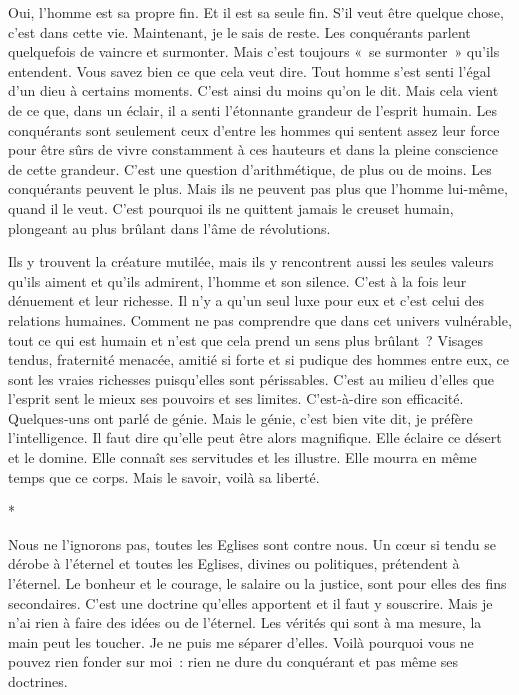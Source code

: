 \documentclass{book}
\begin{document}
Oui, l'homme est sa propre fin. Et il est sa seule fin. S'il veut être quelque chose, c'est dans cette vie. Maintenant, je le sais de reste. Les conquérants parlent quelquefois de vaincre et surmonter. Mais c'est toujours « se surmonter » qu'ils entendent. Vous savez bien ce que cela veut dire. Tout homme s'est senti l'égal d'un dieu à certains moments. C'est ainsi du moins qu'on le dit. Mais cela vient de ce que, dans un éclair, il a senti l'étonnante grandeur de l'esprit humain. Les conquérants sont seulement ceux d'entre les hommes qui sentent assez leur force pour être sûrs de vivre constamment à ces hauteurs et dans la pleine conscience de cette grandeur. C'est une question d'arithmétique, de plus ou de moins. Les conquérants peuvent le plus. Mais ils ne peuvent pas plus que l'homme lui-même, quand il le veut. C'est pourquoi ils ne quittent jamais le creuset humain, plongeant au plus brûlant dans l'âme de révolutions.

Ils y trouvent la créature mutilée, mais ils y rencontrent aussi les seules valeurs qu'ils aiment et qu'ils admirent, l'homme et son silence. C'est à la fois leur dénuement et leur richesse. Il n'y a qu'un seul luxe pour eux et c'est celui des relations humaines. Comment ne pas comprendre que dans cet univers vulnérable, tout ce qui est humain et n'est que cela prend un sens plus brûlant ? Visages tendus, fraternité menacée, amitié si forte et si pudique des hommes entre eux, ce sont les vraies richesses puisqu'elles sont périssables. C'est au milieu d'elles que l'esprit sent le mieux ses pouvoirs et ses limites. C'est-à-dire son efficacité. Quelques‑uns ont parlé de génie. Mais le génie, c'est bien vite dit, je préfère l'intelligence. Il faut dire qu'elle peut être alors magnifique. Elle éclaire ce désert et le domine. Elle connaît ses servitudes et les illustre. Elle mourra en même temps que ce corps. Mais le savoir, voilà sa liberté.

\begin{center}
*
\end{center}

Nous ne l'ignorons pas, toutes les Eglises sont contre nous. Un cœur si tendu se dérobe à l'éternel et toutes les Eglises, divines ou politiques, prétendent à l'éternel. Le bonheur et le courage, le salaire ou la justice, sont pour elles des fins secondaires. C'est une doctrine qu'elles apportent et il faut y souscrire. Mais je n'ai rien à faire des idées ou de l'éternel. Les vérités qui sont à ma mesure, la main peut les toucher. Je ne puis me séparer d'elles. Voilà pourquoi vous ne pouvez rien fonder sur moi : rien ne dure du conquérant et pas même ses doctrines.
\end{document}
